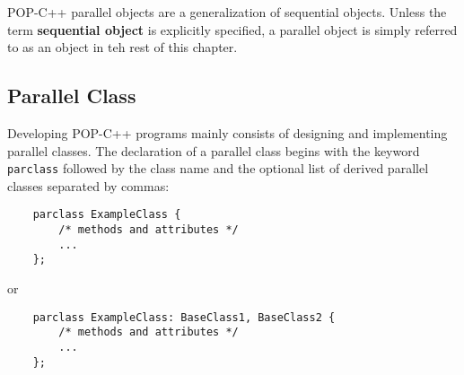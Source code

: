 POP-C++ parallel objects are a generalization of sequential objects. Unless the term
\textbf{sequential object} is explicitly specified, a parallel object is
simply referred to as an object in teh rest of this chapter.




%


\subsection{Parallel Class} \label{sec:class:dec}

Developing POP-C++ programs mainly consists of designing and
implementing parallel classes. The declaration of a parallel class
begins with the keyword \texttt{parclass} followed by the class name and
the optional list of derived parallel classes separated by commas:

\begin{verbatim}
    parclass ExampleClass {
        /* methods and attributes */
        ...
    };
\end{verbatim}

or

\begin{verbatim}
    parclass ExampleClass: BaseClass1, BaseClass2 {
        /* methods and attributes */
        ...
    };
\end{verbatim}

